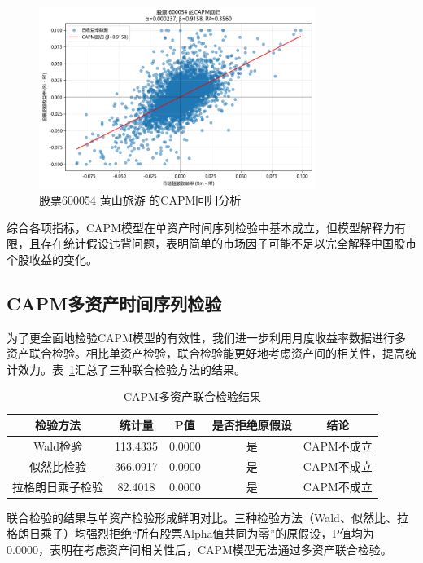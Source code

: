 \documentclass[12pt, a4paper]{article}
\begin{document}
\begin{figure}[htbp]
\centering
\includegraphics[width=0.8\textwidth]{./img/600054_capm.png}
\caption{股票600054 黄山旅游 的CAPM回归分析}
\label{fig:capm_regression_600054}
\end{figure}

综合各项指标，CAPM模型在单资产时间序列检验中基本成立，但模型解释力有限，且存在统计假设违背问题，表明简单的市场因子可能不足以完全解释中国股市个股收益的变化。

\subsection{CAPM多资产时间序列检验}

为了更全面地检验CAPM模型的有效性，我们进一步利用月度收益率数据进行多资产联合检验。相比单资产检验，联合检验能更好地考虑资产间的相关性，提高统计效力。表~\ref{tab:capm_joint_test}汇总了三种联合检验方法的结果。

\begin{table}[htbp]
\centering
\caption{CAPM多资产联合检验结果}
\label{tab:capm_joint_test}
\begin{tabular}{ccccc}
\toprule
检验方法 & 统计量 & P值 & 是否拒绝原假设 & 结论 \\
\midrule
Wald检验 & 113.4335 & 0.0000 & 是 & CAPM不成立 \\
似然比检验 & 366.0917 & 0.0000 & 是 & CAPM不成立 \\
拉格朗日乘子检验 & 82.4018 & 0.0000 & 是 & CAPM不成立 \\
\bottomrule
\end{tabular}
\end{table}

联合检验的结果与单资产检验形成鲜明对比。三种检验方法（Wald、似然比、拉格朗日乘子）均强烈拒绝“所有股票Alpha值共同为零”的原假设，P值均为0.0000，表明在考虑资产间相关性后，CAPM模型无法通过多资产联合检验。
\end{document}
